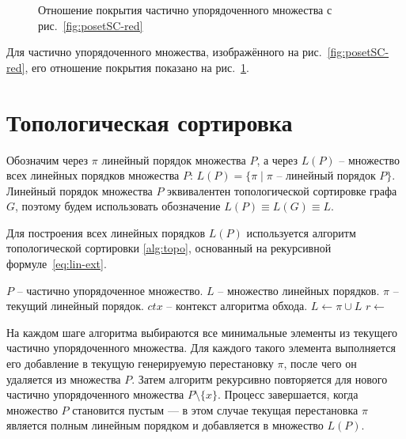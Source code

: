 \begin{figure}[htbp]
  \centerfloat{
    
  }
  \caption{Отношение покрытия частично упорядоченного множества с
  рис.~\cref{fig:posetSC-red}}
  \label{fig:posetSC}
\end{figure}

Для частично упорядоченного множества, изображённого на
рис.~\cref{fig:posetSC-red}, его отношение покрытия показано на
рис.~\cref{fig:posetSC}.

\section{Топологическая сортировка}
\label{sec:ch2/topol}

Обозначим через $\pi$ линейный порядок множества $P$, а через $L(P)$
-- множество всех линейных порядков множества $P$: $L(P) = \{\pi \mid
\pi \text{ -- линейный порядок } P\}$. Линейный порядок множества $P$
эквивалентен топологической сортировке графа $G$, поэтому будем
использовать обозначение $L(P) \equiv L(G) \equiv L$.

Для построения всех линейных порядков $L(P)$ используется алгоритм
топологической сортировки \ref{alg:topo}, основанный на рекурсивной
формуле~\ref{eq:lin-ext}.

\begin{algorithm}[H]
  \caption{Обход частично упорядоченного множества топологической сортировкой}
  \label{alg:topo}
  \begin{algorithmic}[1]
    \Require $P$ -- частично упорядоченное множество.
    \Require $L$ -- множество линейных порядков.
    \Require $\pi$ -- текущий линейный порядок.
    \Require $ctx$ -- контекст алгоритма обхода.
    \State $L \gets \pi \cup L$ 
    \EndIf
    \State $r \gets$ 
    \State {} 
    \State \Return {}
    \EndIf
    \EndFor
    \EndFunction
  \end{algorithmic}
\end{algorithm}

На каждом шаге алгоритма выбираются все минимальные элементы из
текущего частично упорядоченного множества. Для каждого такого
элемента выполняется его добавление в текущую генерируемую
перестановку $\pi$, после чего он удаляется из множества $P$. Затем
алгоритм рекурсивно повторяется для нового частично упорядоченного
множества $P \setminus \{x\}$. Процесс завершается, когда множество
$P$ становится пустым — в этом случае текущая перестановка $\pi$
является полным линейным порядком и добавляется в множество $L(P)$.

